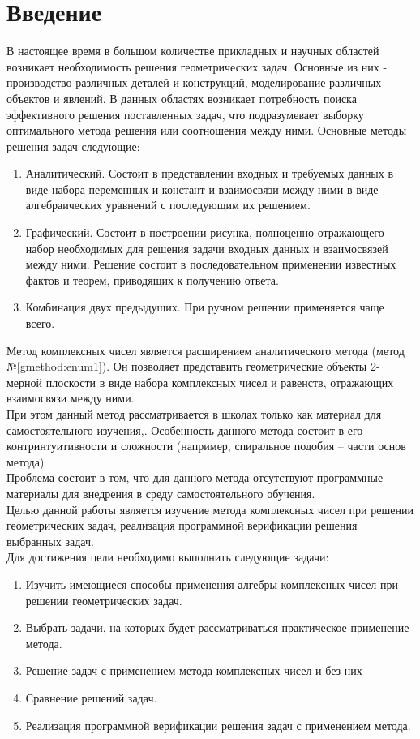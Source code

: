 \documentclass[oneside,final,14pt]{extreport}
\newcommand\tcchapter[1]{%
  \chapter*{#1}%
  \addcontentsline{toc}{chapter}{#1}}
\begin{document}

\thispagestyle{empty}
\clearpage

\tableofcontents

\tcchapter{Введение}
В настоящее время в большом количестве прикладных и научных областей возникает необходимость решения геометрических задач.
Основные из них - производство различных деталей и конструкций, моделирование различных объектов и явлений.
В данных областях возникает потребность поиска эффективного решения поставленных задач, что подразумевает выборку оптимального метода решения или соотношения между ними. Основные методы решения задач следующие\cite{geom:methods}:
\begin{enumerate}
    \item Аналитический. Состоит в представлении входных и требуемых данных в виде набора переменных и констант и взаимосвязи между ними в виде алгебраических уравнений с последующим их решением. \label{gmethod:enum1}
    \item Графический. Состоит в построении рисунка, полноценно отражающего набор необходимых для решения задачи входных данных и взаимосвязей между ними. Решение состоит в последовательном применении известных фактов и теорем, приводящих к получению ответа.
    \item Комбинация двух предыдущих. При ручном решении применяется чаще всего.
\end{enumerate}
Метод комплексных чисел является расширением аналитического метода (метод №\ref{gmethod:enum1}).
Он позволяет представить геометрические объекты 2-мерной плоскости в виде набора комплексных чисел и равенств, отражающих взаимосвязи между ними.\\
При этом данный метод рассматривается в школах только как материал для самостоятельного изучения\cite{edu:problem},\cite[стр.6]{book:ponarin}. Особенность данного метода состоит в его контринтуитивности и сложности (например, спиральное подобия -- части основ метода)\\
Проблема состоит в том, что для данного метода отсутствуют программные материалы для внедрения в среду самостоятельного обучения.\\
Целью данной работы является изучение метода комплексных чисел при решении геометрических задач, реализация программной верификации решения выбранных задач.\\
Для достижения цели необходимо выполнить следующие задачи:
\begin{enumerate}
    \item Изучить имеющиеся способы применения алгебры комплексных чисел при решении геометрических задач.
    \item Выбрать задачи, на которых будет рассматриваться практическое применение метода.
    \item Решение задач с применением метода комплексных чисел и без них
    \item Сравнение решений задач.
    \item Реализация программной верификации решения задач с применением метода.
\end{enumerate}
\end{document}
